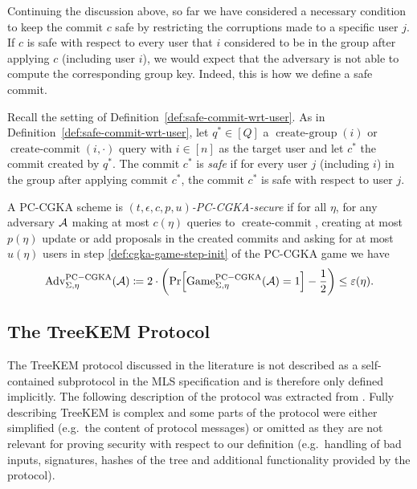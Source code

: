 Continuing the discussion above, so far we have considered a necessary condition to keep the commit $c$ safe by restricting the corruptions made to a specific user $j$. If $c$ is safe with respect to every user that $i$ considered to be in the group after applying $c$ (including user $i$), we would expect that the adversary is not able to compute the corresponding group key. Indeed, this is how we define a safe commit.

\begin{definition} \label{def:safe-commit}
	Recall the setting of Definition~\ref{def:safe-commit-wrt-user}. As in Definition~\ref{def:safe-commit-wrt-user}, let $q^* \in [Q]$ a $\operatorname{create-group}(i)$ or $\operatorname{create-commit}(i, \cdot)$ query with $i \in [n]$ as the target user and let $c^*$ the commit created by $q^*$. The commit $c^*$ is \emph{safe} if for every user $j$ (including $i$) in the group after applying commit $c^*$, the commit $c^*$ is safe with respect to user $j$.
\end{definition}

\begin{definition}
	A PC-CGKA scheme is \emph{$(t, \epsilon, c, p, u)$-PC-CGKA-secure} if for all $\eta$, for any adversary $\mathcal{A}$ making at most $c(\eta)$ queries to $\operatorname{create-commit}$, creating at most $p(\eta)$ update or add proposals in the created commits and asking for at most $u(\eta)$ users in step \ref{def:cgka-game-step-init} of the PC-CGKA game we have
	\begin{align*}
		\advantage{\Sigma}{\eta}{PC-CGKA}(\adv) \coloneqq 2 \cdot \left(\pr{\game{\Sigma}{\eta}{PC-CGKA}(\adv) = 1} - \frac{1}{2}\right) \le \epsilon(\eta).
	\end{align*}
\end{definition}

\subsection{The TreeKEM Protocol}

The TreeKEM protocol discussed in the literature is not described as a self-contained subprotocol in the MLS specification \cite{rfc9420} and is therefore only defined implicitly. The following description of the protocol was extracted from \cite{rfc9420}. Fully describing TreeKEM is complex and some parts of the protocol were either simplified (e.g.\ the content of protocol messages) or omitted as they are not relevant for proving security with respect to our definition (e.g.\ handling of bad inputs, signatures, hashes of the tree and additional functionality provided by the protocol).

